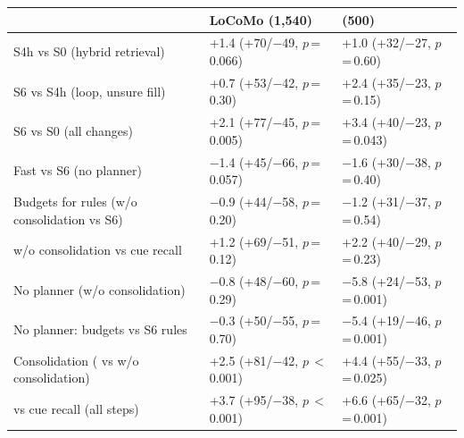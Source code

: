 \begin{gentable}
\centering
\small
\caption{\textbf{Paired comparisons in the standard setting} (gpt-4.1-mini judge): net change in points, questions gained and lost, exact McNemar $p$.}
\label{tab:paired-standard}
\begin{tabular}{@{}lll@{}}
\toprule
& LoCoMo (1,540) & \lme{} (500) \\
\midrule
S4h vs S0 (hybrid retrieval) & +1.4 (+70/$-$49, $p$\,=\,0.066) & +1.0 (+32/$-$27, $p$\,=\,0.60) \\
S6 vs S4h (loop, unsure fill) & +0.7 (+53/$-$42, $p$\,=\,0.30) & +2.4 (+35/$-$23, $p$\,=\,0.15) \\
S6 vs S0 (all changes) & +2.1 (+77/$-$45, $p$\,=\,0.005) & +3.4 (+40/$-$23, $p$\,=\,0.043) \\
Fast vs S6 (no planner) & $-$1.4 (+45/$-$66, $p$\,=\,0.057) & $-$1.6 (+30/$-$38, $p$\,=\,0.40) \\
\midrule
Budgets for rules (w/o consolidation vs S6) & $-$0.9 (+44/$-$58, $p$\,=\,0.20) & $-$1.2 (+31/$-$37, $p$\,=\,0.54) \\
w/o consolidation vs cue recall & +1.2 (+69/$-$51, $p$\,=\,0.12) & +2.2 (+40/$-$29, $p$\,=\,0.23) \\
No planner (w/o consolidation) & $-$0.8 (+48/$-$60, $p$\,=\,0.29) & $-$5.8 (+24/$-$53, $p$\,=\,0.001) \\
No planner: budgets vs S6 rules & $-$0.3 (+50/$-$55, $p$\,=\,0.70) & $-$5.4 (+19/$-$46, $p$\,=\,0.001) \\
\midrule
Consolidation (\sys{} vs w/o consolidation) & +2.5 (+81/$-$42, $p$\,$<$\,0.001) & +4.4 (+55/$-$33, $p$\,=\,0.025) \\
\sys{} vs cue recall (all steps) & +3.7 (+95/$-$38, $p$\,$<$\,0.001) & +6.6 (+65/$-$32, $p$\,=\,0.001) \\
\bottomrule
\end{tabular}
\end{gentable}
